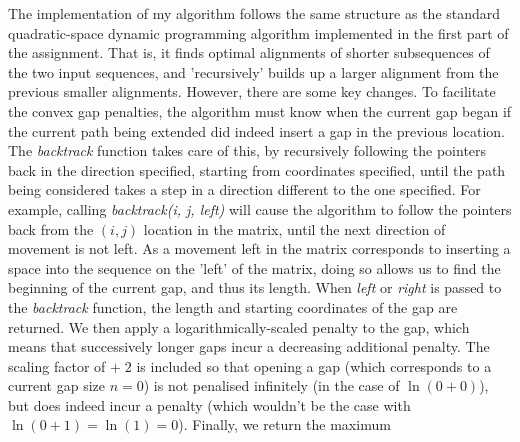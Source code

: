 \documentclass[a4paper]{article}
\begin{document}
The implementation of my algorithm follows the same structure as the standard quadratic-space dynamic programming algorithm implemented in the first part of the assignment. That is, it finds optimal alignments of shorter subsequences of the two input sequences, and 'recursively' builds up a larger alignment from the previous smaller alignments. However, there are some key changes. To facilitate the convex gap penalties, the algorithm must know when the current gap began if the current path being extended did indeed insert a gap in the previous location. The \textit{backtrack} function takes care of this, by recursively following the pointers back in the direction specified, starting from coordinates specified, until the path being considered takes a step in a direction different to the one specified. For example, calling \textit{backtrack(i, j, left)} will cause the algorithm to follow the pointers back from the $(i, j)$ location in the matrix, until the next direction of movement is not left. As a movement left in the matrix corresponds to inserting a space into the sequence on the 'left' of the matrix, doing so allows us to find the beginning of the current gap, and thus its length. When \textit{left} or \textit{right} is passed to the \textit{backtrack} function, the length and starting coordinates of the gap are returned. We then apply a logarithmically-scaled penalty to the gap, which means that successively longer gaps incur a decreasing additional penalty. The scaling factor of $+\;2$ is included so that opening a gap (which corresponds to a current gap size $n = 0$) is not penalised infinitely (in the case of $\ln(0 + 0)$), but does indeed incur a penalty (which wouldn't be the case with $\ln(0 + 1) = \ln(1) = 0$). Finally, we return the maximum
\end{document}
